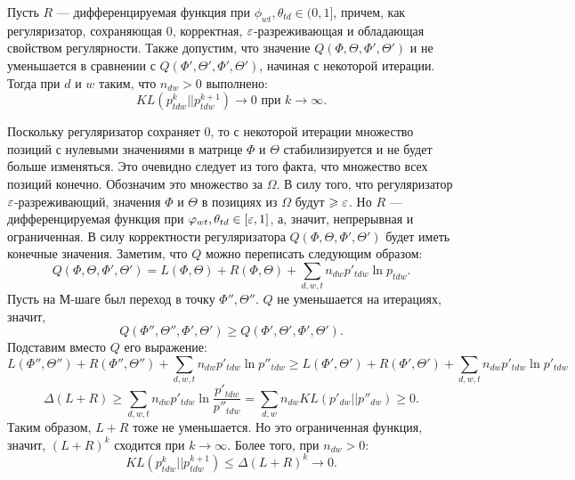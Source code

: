 \documentclass[12pt, twoside]{article}
\begin{document}
\begin{Theorem} \label{Theorem_neighbour_zero1} Пусть $R$ --- дифференцируемая функция при $\phi_{wt}, \theta_{td} \in (0, 1]$, причем, как регуляризатор, сохраняющая 0, корректная, $\varepsilon$-разреживающая и обладающая свойством регулярности. Также допустим,  что значение $Q(\Phi, \Theta, \Phi', \Theta')$  и не уменьшается в сравнении с $Q(\Phi', \Theta', \Phi', \Theta')$, начиная с некоторой итерации. Тогда при $d$ и $w$ таким, что $n_{dw} > 0$ выполнено:
\[
KL(p_{tdw}^{k}||p_{tdw}^{k+1}) \to 0 \text{ при }  k \to \infty.
\]
\end{Theorem}
\begin{Proof}
Поскольку регуляризатор сохраняет 0, то с некоторой итерации множество позиций с нулевыми значениями в матрице $\Phi$ и $\Theta$ стабилизируется и не будет больше изменяться. Это очевидно следует из того факта, что  множество всех позиций конечно. Обозначим это множество за $\Omega$. В силу того, что регуляризатор $\varepsilon$-разреживающий, значения $\Phi$ и $\Theta$ в позициях из $\Omega$ будут $\geqslant \varepsilon$. Но $R$ --- дифференцируемая функция при $\varphi_{wt}, \theta_{td} \in [\varepsilon, 1]$, а, значит, непрерывная и ограниченная. В силу корректности регуляризатора $Q(\Phi, \Theta, \Phi', \Theta')$  будет иметь конечные значения.
Заметим, что $Q$ можно переписать следующим образом:
\[
Q(\Phi, \Theta, \Phi', \Theta') = L(\Phi, \Theta) +  R(\Phi, \Theta) + \sum\limits_{d, w, t} n_{dw} p'_{tdw} \ln{p_{tdw}}.
\]
Пусть на М-шаге был переход в точку $\Phi'', \Theta''$. $Q$ не уменьшается на итерациях, значит,
\[
	Q(\Phi'', \Theta'', \Phi', \Theta') \geq Q(\Phi', \Theta', \Phi', \Theta').
\]
Подставим вместо $Q$ его выражение:
\[
	L(\Phi'', \Theta'') + R(\Phi'', \Theta'') + \sum\limits_{d, w, t} n_{dw} p'_{tdw} \ln{p''_{tdw}}  \geq L(\Phi', \Theta') +  R(\Phi', \Theta') + \sum\limits_{d, w, t} n_{dw} p'_{tdw} \ln{p'_{tdw}}
\]
\[
	\Delta(L +  R) \geq  \sum\limits_{d, w, t} n_{dw} p'_{tdw} \ln{\frac{p'_{tdw}}{p''_{tdw}}} = \sum\limits_{d, w} n_{dw} KL(p'_{dw} || p''_{dw}) \geq 0.
\]
Таким образом, $L +  R$  тоже не уменьшается. Но это ограниченная функция, значит, $(L + R)^{k}$ сходится при $k \to \infty$. Более того, при $n_{dw} > 0$:
\[
	KL(p_{tdw}^{k}||p_{tdw}^{k+1}) \leq \Delta (L +  R)^{k} \to 0.
\]
\end{Proof}
\end{document}
